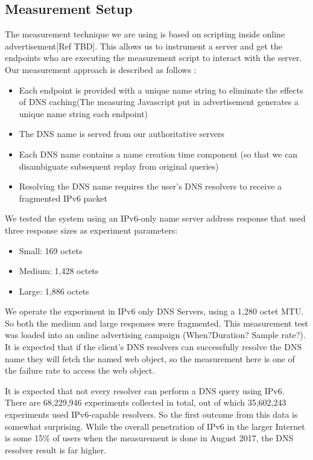 \subsection{Measurement Setup}


The measurement technique we are using is based on scripting inside 
online advertisement[Ref TBD]. This allows us to instrument a server and get the 
endpoints who are executing the measurement script to interact with 
the server. Our measurement approach is described as follows :


\begin{itemize}
  \item Each endpoint is provided with a unique	name string to eliminate the effects of DNS caching(The measuring Javascript put in advertisement generates a unique name string each endpoint)
  \item The	DNS	name is served from	our	authoritative servers
  \item Each DNS name contains a name creation time	component (so that we can disambiguate subsequent replay from original queries)
  \item Resolving the DNS name requires	the	user’s	DNS	resolvers to receive a fragmented IPv6 packet
\end{itemize}

We tested the system using an IPv6-only name server address 
response that used three response sizes as experiment parameters:

\begin{itemize}
  \item Small: 169 octets
  \item Medium: 1,428 octets
  \item Large: 1,886 octets
\end{itemize}

We operate the experiment in IPv6 only DNS Servers, using a 1,280 
octet MTU. So both the medium and large responses were fragmented. 
This measurement test was loaded into an online advertising campaign 
(When?Duration? Sample rate?). It is expected that if the client’s DNS 
resolvers can successfully resolve	the	DNS	name they will fetch the 
named web object, so the measurement here is one of the failure rate 
to access the web object.

It is expected that not every resolver can perform a DNS query using 
IPv6. There are 68,229,946 experiments collected in total, out of which   
35,602,243 experiments used IPv6-capable resolvers. So the first outcome 
from this data is somewhat surprising. While the overall penetration of 
IPv6 in the larger Internet is some 15\% of users when the measurement is 
done in August 2017, the DNS resolver result is far higher. 

